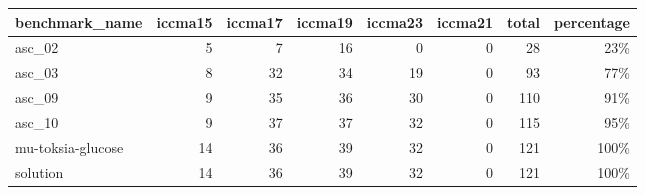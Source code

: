 \begin{tabular}{lrrrrrrr}
\toprule
benchmark_name & iccma15 & iccma17 & iccma19 & iccma23 & iccma21 & total & percentage \\
\midrule
asc_02 & 5 & 7 & 16 & 0 & 0 & 28 & 23\% \\
asc_03 & 8 & 32 & 34 & 19 & 0 & 93 & 77\% \\
asc_09 & 9 & 35 & 36 & 30 & 0 & 110 & 91\% \\
asc_10 & 9 & 37 & 37 & 32 & 0 & 115 & 95\% \\
mu-toksia-glucose & 14 & 36 & 39 & 32 & 0 & 121 & 100\% \\
\midrule
solution & 14 & 36 & 39 & 32 & 0 & 121 & 100\% \\
\bottomrule
\end{tabular}

